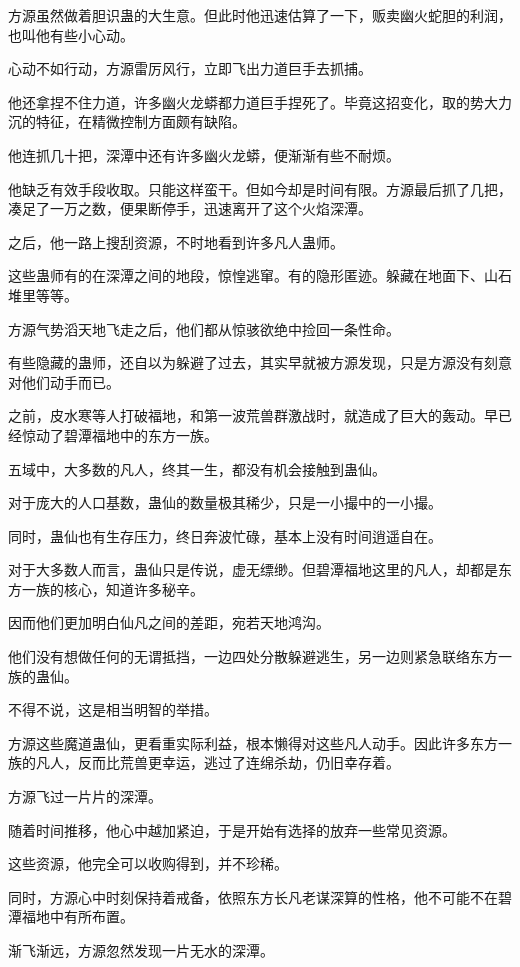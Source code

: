 \begin{this_body}
方源虽然做着胆识蛊的大生意。但此时他迅速估算了一下，贩卖幽火蛇胆的利润，也叫他有些小心动。

心动不如行动，方源雷厉风行，立即飞出力道巨手去抓捕。

他还拿捏不住力道，许多幽火龙蟒都力道巨手捏死了。毕竟这招变化，取的势大力沉的特征，在精微控制方面颇有缺陷。

他连抓几十把，深潭中还有许多幽火龙蟒，便渐渐有些不耐烦。

他缺乏有效手段收取。只能这样蛮干。但如今却是时间有限。方源最后抓了几把，凑足了一万之数，便果断停手，迅速离开了这个火焰深潭。

之后，他一路上搜刮资源，不时地看到许多凡人蛊师。

这些蛊师有的在深潭之间的地段，惊惶逃窜。有的隐形匿迹。躲藏在地面下、山石堆里等等。

方源气势滔天地飞走之后，他们都从惊骇欲绝中捡回一条性命。

有些隐藏的蛊师，还自以为躲避了过去，其实早就被方源发现，只是方源没有刻意对他们动手而已。

之前，皮水寒等人打破福地，和第一波荒兽群激战时，就造成了巨大的轰动。早已经惊动了碧潭福地中的东方一族。

五域中，大多数的凡人，终其一生，都没有机会接触到蛊仙。

对于庞大的人口基数，蛊仙的数量极其稀少，只是一小撮中的一小撮。

同时，蛊仙也有生存压力，终日奔波忙碌，基本上没有时间逍遥自在。

对于大多数人而言，蛊仙只是传说，虚无缥缈。但碧潭福地这里的凡人，却都是东方一族的核心，知道许多秘辛。

因而他们更加明白仙凡之间的差距，宛若天地鸿沟。

他们没有想做任何的无谓抵挡，一边四处分散躲避逃生，另一边则紧急联络东方一族的蛊仙。

不得不说，这是相当明智的举措。

方源这些魔道蛊仙，更看重实际利益，根本懒得对这些凡人动手。因此许多东方一族的凡人，反而比荒兽更幸运，逃过了连绵杀劫，仍旧幸存着。

方源飞过一片片的深潭。

随着时间推移，他心中越加紧迫，于是开始有选择的放弃一些常见资源。

这些资源，他完全可以收购得到，并不珍稀。

同时，方源心中时刻保持着戒备，依照东方长凡老谋深算的性格，他不可能不在碧潭福地中有所布置。

渐飞渐远，方源忽然发现一片无水的深潭。


\end{this_body}
